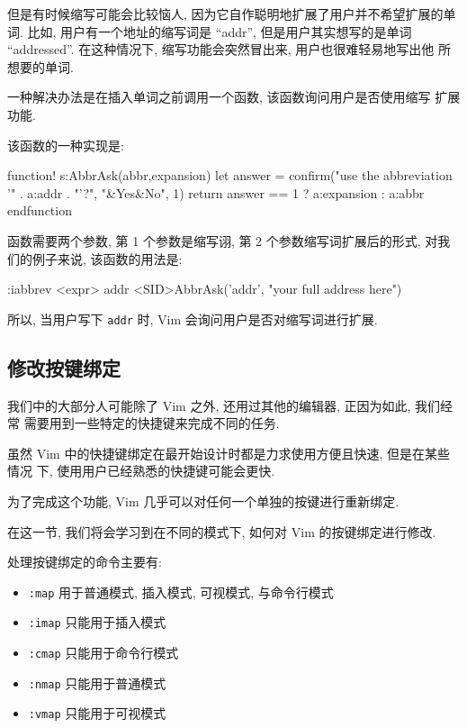 但是有时候缩写可能会比较恼人, 因为它自作聪明地扩展了用户并不希望扩展的单词.
比如, 用户有一个地址的缩写词是 ``addr'', 但是用户其实想写的是单词
``addressed''. 在这种情况下, 缩写功能会突然冒出来, 用户也很难轻易地写出他
所想要的单词.

一种解决办法是在插入单词之前调用一个函数, 该函数询问用户是否使用缩写
扩展功能.

该函数的一种实现是:
\begin{vimscript}
function! s:AbbrAsk(abbr,expansion)
    let answer = confirm("use the abbreviation '" . a:addr . "'?",
        "&Yes\n&No", 1)
    return answer ==  1 ? a:expansion : a:abbr
endfunction
\end{vimscript}

函数需要两个参数, 第 1 个参数是缩写诩, 第 2 个参数缩写词扩展后的形式,
对我们的例子来说, 该函数的用法是:
\begin{vimcmd}
:iabbrev <expr> addr <SID>AbbrAsk('addr', "your full address here")
\end{vimcmd}

所以, 当用户写下 \texttt{addr} 时, Vim 会询问用户是否对缩写词进行扩展.

\subsection{修改按键绑定}
\label{subsec:modifying_key_bindings}

我们中的大部分人可能除了 Vim 之外, 还用过其他的编辑器, 正因为如此, 我们经常
需要用到一些特定的快捷键来完成不同的任务.

虽然 Vim 中的快捷键绑定在最开始设计时都是力求使用方便且快速, 但是在某些情况
下, 使用用户已经熟悉的快捷键可能会更快.

为了完成这个功能, Vim 几乎可以对任何一个单独的按键进行重新绑定.

在这一节, 我们将会学习到在不同的模式下, 如何对 Vim 的按键绑定进行修改.

处理按键绑定的命令主要有:
\begin{itemize}
    \item \texttt{:map}  用于普通模式, 插入模式, 可视模式, 与命令行模式
    \item \texttt{:imap}  只能用于插入模式
    \item \texttt{:cmap}  只能用于命令行模式
    \item \texttt{:nmap}  只能用于普通模式
    \item \texttt{:vmap}  只能用于可视模式
\end{itemize}

